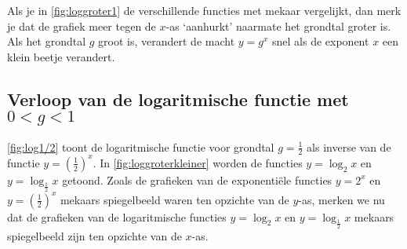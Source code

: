 Als je in \cref{fig:loggroter1} de verschillende functies met mekaar vergelijkt, dan merk je dat de grafiek meer tegen de $x$-as `aanhurkt' naarmate het grondtal groter is. Als het grondtal $g$ groot is, verandert de macht $y=g^x$ snel als de exponent $x$ een klein beetje verandert. 

\subsection[Verloop van de logaritmische functie met
$0<g<1$] {Verloop van de logaritmische functie met
\boldmath$0<g<1$\unboldmath} 

\cref{fig:log1/2} toont de
logaritmische functie voor grondtal $g=\frac{1}{2}$ als inverse van de functie $y=\left(\frac12\right)^x$. 
In \cref{fig:loggroterkleiner} worden de functies $y=\log_2x$ en $y=\log_{\frac12}x$ getoond. Zoals de grafieken van de exponenti\"ele functies $y=2^x$ en $y=\left(\frac12\right)^x$ mekaars spiegelbeeld waren ten opzichte van de $y$-as, merken we nu dat de grafieken van de logaritmische functies  $y=\log_2x$ en $y=\log_{\frac12}x$ mekaars spiegelbeeld zijn ten opzichte van de $x$-as. 

